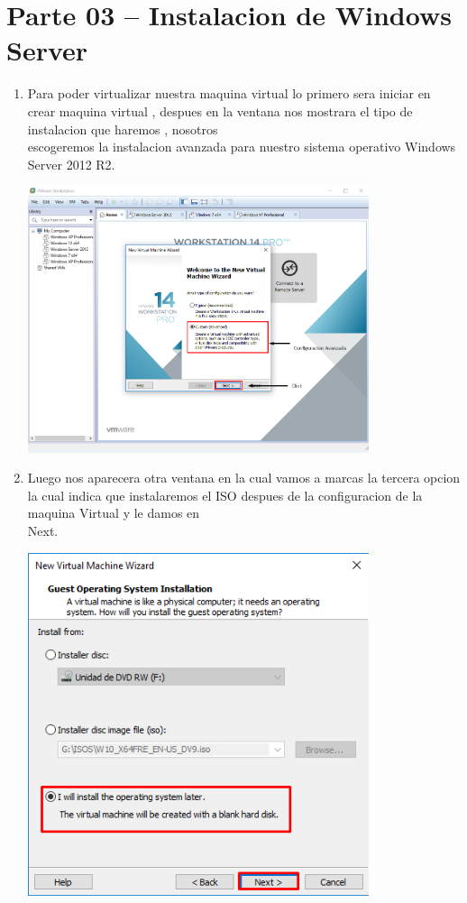 \section{Parte 03 – Instalacion de Windows Server} 
\begin{enumerate}[1.]
	      
	\item Para poder virtualizar nuestra maquina virtual lo primero sera iniciar en crear maquina virtual , despues en la ventana nos mostrara el tipo de instalacion que haremos , nosotros          		\\escogeremos la instalacion avanzada para nuestro sistema operativo Windows Server 2012 R2.\\
	\begin{center}
	\includegraphics[width=10cm]{./Imagenes/ang1} 
	\end{center}
	

	\item Luego nos aparecera otra ventana en la cual vamos a marcas la tercera opcion la cual indica que instalaremos el ISO despues de la configuracion de la maquina Virtual y le damos en   		\\Next.\\
	\begin{center}
	\includegraphics[width=10cm]{./Imagenes/ang2} 
	\end{center}
	

\end{enumerate}
